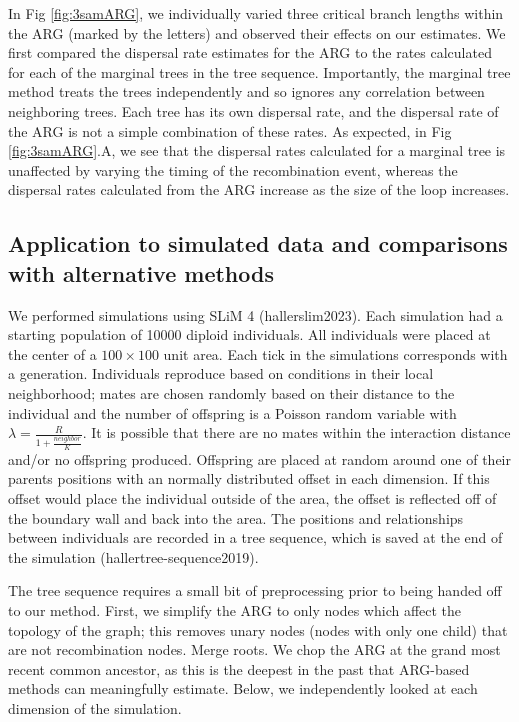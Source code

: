 In Fig \ref{fig:3samARG}, we individually varied three critical branch lengths within the ARG (marked by the letters) and observed their effects on our estimates. We first compared the dispersal rate estimates for the ARG to the rates calculated for each of the marginal trees in the tree sequence. Importantly, the marginal tree method treats the trees independently and so ignores any correlation between neighboring trees. Each tree has its own dispersal rate, and the dispersal rate of the ARG is not a simple combination of these rates. As expected, in Fig \ref{fig:3samARG}.A, we see that the dispersal rates calculated for a marginal tree is unaffected by varying the timing of the recombination event, whereas the dispersal rates calculated from the ARG increase as the size of the loop increases.

\subsection{Application to simulated data and comparisons with alternative methods} \label{SLiMsims}

We performed simulations using SLiM 4 (hallerslim2023). Each simulation had a starting population of 10000 diploid individuals. All individuals were placed at the center of a $100 \times 100$ unit area. Each tick in the simulations corresponds with a generation. Individuals reproduce based on conditions in their local neighborhood; mates are chosen randomly based on their distance to the individual and the number of offspring is a Poisson random variable with $\lambda=\frac{R}{1 + \frac{neighbor}{K}}$. It is possible that there are no mates within the interaction distance and/or no offspring produced. Offspring are placed at random around one of their parents positions with an normally distributed offset in each dimension. If this offset would place the individual outside of the area, the offset is reflected off of the boundary wall and back into the area. The positions and relationships between individuals are recorded in a tree sequence, which is saved at the end of the simulation (hallertree-sequence2019).

 The tree sequence requires a small bit of preprocessing prior to being handed off to our method. First, we simplify the ARG to only nodes which affect the topology of the graph; this removes unary nodes (nodes with only one child) that are not recombination nodes. Merge roots. We chop the ARG at the grand most recent common ancestor, as this is the deepest in the past that ARG-based methods can meaningfully estimate. Below, we independently looked at each dimension of the simulation.

